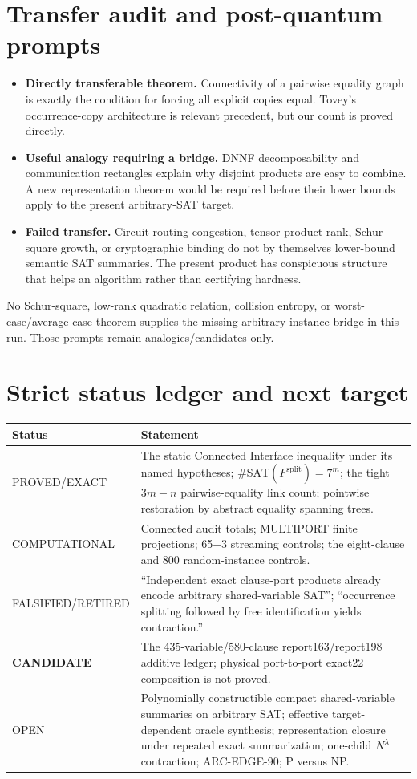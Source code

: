 \documentclass[11pt]{article}
\begin{document}
\section{Transfer audit and post-quantum prompts}
\begin{itemize}
\item \textbf{Directly transferable theorem.}  Connectivity of a pairwise
equality graph is exactly the condition for forcing all explicit copies equal.
Tovey's occurrence-copy architecture is relevant precedent, but our count is
proved directly.
\item \textbf{Useful analogy requiring a bridge.}  DNNF decomposability and
communication rectangles explain why disjoint products are easy to combine.
A new representation theorem would be required before their lower bounds
apply to the present arbitrary-SAT target.
\item \textbf{Failed transfer.}  Circuit routing congestion, tensor-product
rank, Schur-square growth, or cryptographic binding do not by themselves
lower-bound semantic SAT summaries.  The present product has conspicuous
structure that helps an algorithm rather than certifying hardness.
\end{itemize}
No Schur-square, low-rank quadratic relation, collision entropy, or
worst-case/average-case theorem supplies the missing arbitrary-instance
bridge in this run.  Those prompts remain analogies/candidates only.

\section{Strict status ledger and next target}
\begin{center}
\begin{tabular}{>{\raggedright\arraybackslash}p{.24\linewidth}p{.67\linewidth}}
\toprule
Status & Statement\\
\midrule
PROVED/EXACT & The static Connected Interface inequality under its named
hypotheses; $\#\mathrm{SAT}(F^{\mathrm{split}})=7^m$; the tight $3m-n$
pairwise-equality link count; pointwise restoration by abstract equality
spanning trees.\\
COMPUTATIONAL & Connected audit totals; MULTIPORT finite projections; 65+3
streaming controls; the eight-clause and 800 random-instance controls.\\
FALSIFIED/RETIRED & ``Independent exact clause-port products already encode
arbitrary shared-variable SAT''; ``occurrence splitting followed by free
identification yields contraction.''\\
\textbf{CANDIDATE} & The 435-variable/580-clause report163/report198 additive
ledger; physical port-to-port exact22 composition is not proved.\\
OPEN & Polynomially constructible compact shared-variable summaries on
arbitrary SAT; effective target-dependent oracle synthesis; representation
closure under repeated exact summarization; one-child $N^\lambda$ contraction;
ARC-EDGE-90; P versus NP.\\
\bottomrule
\end{tabular}
\end{center}
\end{document}
